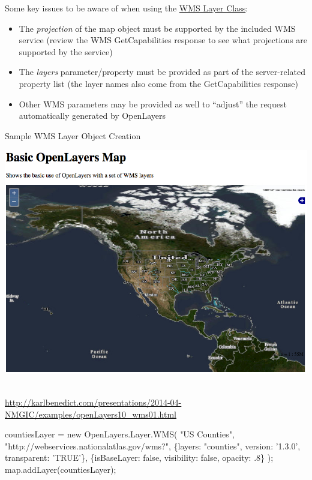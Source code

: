 \documentclass[]{article}
\newenvironment{Shaded}{}{}
\newcommand{\NormalTok}[1]{{#1}}
\begin{document}
Some key issues to be aware of when using the
\href{http://dev.openlayers.org/releases/OpenLayers-2.13/doc/apidocs/files/OpenLayers/Layer/WMS-js.html}{WMS
Layer Class}:

\begin{itemize}
\itemsep1pt\parskip0pt
\item
  The \emph{projection} of the map object must be supported by the
  included WMS service (review the WMS GetCapabilities response to see
  what projections are supported by the service)
\item
  The \emph{layers} parameter/property must be provided as part of the
  server-related property list (the layer names also come from the
  GetCapabilities response)
\item
  Other WMS parameters may be provided as well to ``adjust'' the request
  automatically generated by OpenLayers
\end{itemize}

Sample WMS Layer Object Creation

\includegraphics{images/OpenLayers_02.jpg}~

\url{http://karlbenedict.com/presentations/2014-04-NMGIC/examples/openLayers10_wms01.html}

\begin{Shaded}
\begin{Highlighting}[numbers=left,,]
    \NormalTok{countiesLayer = new OpenLayers.Layer.WMS( }
        \NormalTok{"US Counties", }
        \NormalTok{"http://webservices.nationalatlas.gov/wms?",}
        \NormalTok{\{layers: "counties", version: '1.3.0', transparent: 'TRUE'\},}
        \NormalTok{\{isBaseLayer: false, visibility: false, opacity: .8\}}
    \NormalTok{);}
    \NormalTok{map.addLayer(countiesLayer);}
\end{Highlighting}
\end{Shaded}
\end{document}
